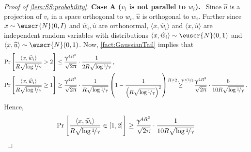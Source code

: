 \documentclass[11pt,letterpaper]{article}
\theoremstyle{plain}
\theoremstyle{definition}
\theoremstyle{remark}
\newcommand{\Stackrel}[2]{\stackrel{\mathmakebox[\widthof{\ensuremath{#2}}]{#1}}{#2}}
\newcommand{\sinangle}[1]{\ensuremath{\langle#1\rangle}}
\newcommand{\inparen}[1]{\ensuremath{\left(#1\right)}}
\newcommand{\insquare}[1]{\ensuremath{\left[#1\right]}}
\newcommand{\nfrac}[2]{\nicefrac{#1}{#2}}
\newcommand{\wh}[1]{\widehat{#1}}
\newcommand{\customcal}[1]{\euscr{#1}}
\newcommand{\cN}{\customcal{N}}
\renewcommand{\paragraph}[1]{\medskip \noindent\textbf{#1}~}
\renewcommand{\gamma}{\upgamma}
\renewcommand{\pi}{\uppi}
\begin{document}
{{{\begin{proof}[Proof of \cref{lem:SS:probability}]
                \paragraph{Case A ($v_i$ is not parallel to $w_i$).}
                    Since $\wh{u}$ is a projection of $v_i$ in a space orthogonal to $w_i$, $\wh{u}$ is orthogonal to $w_i$.
                    Further since $x\sim \cN(0,I)$ and $\wh w_i, \wh u$ are orthonormal, 
                    $\sinangle{x, \wh{w}_i}$ and $\sinangle{x, \wh{u}}$ are independent random variables with distributions $\sinangle{x, \wh{w}_i}\sim \cN(0,1)$ and $\sinangle{x, \wh{u}}\sim \cN(0,1)$.
                    Now, \cref{fact:GaussianTail} implies that 
                    \begin{align*}
                        \Pr\insquare{
                            \frac{
                                \sinangle{x, \wh{w}_i}
                            }{
                                R\sqrt{\log{\nfrac{1}{\gamma}}}
                            }
                            >
                            2
                        }
                        &\leq \frac{\gamma^{4R^2}}{\sqrt{2\pi}} \cdot 
                        \frac{1}{2R\sqrt{\log{\nfrac{1}{\gamma}}}}\,,\\
                        \Pr\insquare{
                            \frac{
                                \sinangle{x, \wh{w}_i}
                            }{
                                R\sqrt{\log{\nfrac{1}{\gamma}}}
                            } \geq 1
                        }
                        &\geq 
                        \frac{\gamma^{4R^2}}{\sqrt{2\pi}} \cdot 
                        \frac{1}{R\sqrt{\log{\nfrac{1}{\gamma}}}} 
                        \inparen{
                            1 - \frac{1}{\inparen{
                                R\sqrt{\log{\nfrac{1}{\gamma}}}
                            }^2}
                        }
                        \quad~~ \Stackrel{R\geq 2\,,~\gamma\leq \nfrac{1}{2}}{\geq}\quad~~ 
                        \frac{\gamma^{4R^2}}{\sqrt{2\pi}} \cdot 
                        \frac{6}{10R\sqrt{\log{\nfrac{1}{\gamma}}}} 
                        \,.
                    \end{align*} 
                    Hence, 
                    \[
                        \Pr\insquare{
                            \frac{\sinangle{x, \wh{w}_i}}{
                                R\sqrt{\log{\nfrac{1}{\gamma}}}
                            } \in [1,2]
                        }
                        \geq \frac{\gamma^{4R^2}}{\sqrt{2\pi}} \cdot \frac{1}{10R\sqrt{\log{\nfrac{1}{\gamma}}}}
\]
\end{proof}}}}
\end{document}

